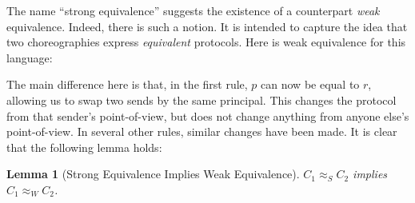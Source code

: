 \documentclass{article}
\newtheorem{lem}{Lemma}
\theoremstyle{definition}
\newcommand{\ceq}{\approx}
\newcommand{\own}[2]{#1.#2}
\newcommand{\send}[3][]{#2\nolinebreak \mathrel{\xrightarrow{#1}}\nolinebreak #3}
\newcommand{\cif}[3]{\textsf{if}~#1 \mathrel{\textsf{then}}\nolinebreak #2 \mathrel{\textsf{else}}\nolinebreak #3}
\newcommand{\clet}[2]{\textsf{let}~#1\nolinebreak =\nolinebreak #2 \mathrel{\textsf{in}}}
\begin{document}
The name ``strong equivalence'' suggests the existence of a counterpart \emph{weak} equivalence.
Indeed, there is such a notion.
It is intended to capture the idea that two choreographies express \emph{equivalent} protocols.
Here is weak equivalence for this language:
\noindent{}
\noindent The main difference here is that, in the first rule, $p$ can now be equal to $r$, allowing us to swap two sends by the same principal.
This changes the protocol from that sender's point-of-view, but does not change anything from anyone else's point-of-view.
In several other rules, similar changes have been made.
It is clear that the following lemma holds:
\begin{lem}[Strong Equivalence Implies Weak Equivalence]
  $C_1 \ceq_S C_2$ implies $C_1 \ceq_W C_2$.
\end{lem}
\end{document}
